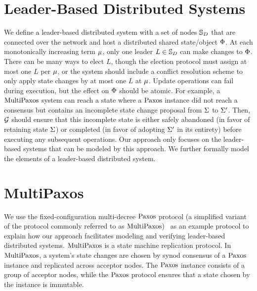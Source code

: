 \section{Leader-Based Distributed Systems}
\label{chapter:witnesspassing:sec:leader-based-distributed-systems}


We define a leader-based distributed system with a set of nodes 
$\mathbb{S}_{D}$ that are connected over the network and host a distributed shared state/object
$\Phi$. At each monotonically increasing term $\mu$, only one leader 
$L \in \mathbb{S}_{D}$ can make changes to $\Phi$. There can be many ways to elect
$L$, though the  election protocol must assign at most one $L$ per $\mu$,
or the system should include a conflict resolution scheme to only apply
state changes by at most one $L$ at $\mu$.
Update operations can fail during execution, but the effect on $\Phi$ should be atomic. 
For example, a $\mathrm{MultiPaxos}$ system can reach a
state where a $\mathrm{Paxos}$ instance did not reach a consensus but contains an
incomplete state change proposal from $\Sigma$ to $\Sigma^\prime$.
Then, $\mathcal{G}$ should ensure that this incomplete state is either safely abandoned (in favor of retaining state $\Sigma$)
or completed (in favor of adopting $\Sigma^\prime$ in its entirety)
before executing any subsequent operations. 
Our approach only focuses on the leader-based systems that can be modeled by this approach.
We further formally model the elements of a leader-based distributed system.

\section{MultiPaxos}
\label{chapter:witnesspassing:multipaxos}


We use the fixed-configuration multi-decree $\mathrm{Paxos}$ protocol (a simplified variant
of the protocol commonly referred to as $\mathrm{MultiPaxos}$)~\cite{rvrpaxos}
as an example protocol to explain how our approach facilitates modeling and
verifying leader-based distributed systems. $\mathrm{MultiPaxos}$ is a
state machine replication protocol. In $\mathrm{MultiPaxos}$, a system's state changes
are chosen by synod consensus of a $\mathrm{Paxos}$ instance and replicated across acceptor nodes.
The $\mathrm{Paxos}$ instance consists of a group of acceptor nodes, while the $\mathrm{Paxos}$ protocol ensures that a state chosen by the instance is immutable.

